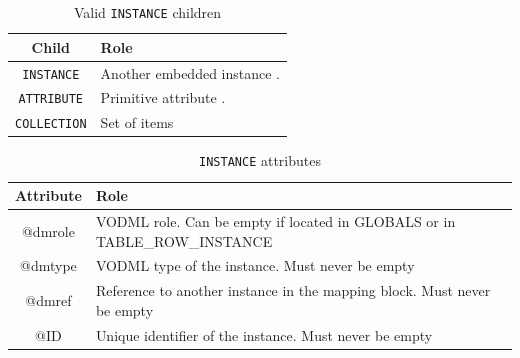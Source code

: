 \documentclass[11pt,a4paper]{ivoa}
\begin{document}
\begin{table}[!htbp]
\small
\centering
\begin{tabulary}{\linewidth}{|c|J|}       
       \hline 
           \textbf{Child} &  
           \textbf{Role} \\
       \hline         \hline  
           \texttt{INSTANCE}    & 
           Another embedded instance . \\       
       \hline  
           \texttt{ATTRIBUTE}    & 
           Primitive attribute . \\       
       \hline  
            \texttt{COLLECTION}    & 
           Set of items\\      
       \hline 
     \end{tabulary}
     \caption{Valid  \texttt{INSTANCE} children} 
     \label{tbl:inst-chilrdren}
\end{table}

\begin{table}[!htbp]
\small
\centering
\begin{tabulary}{\linewidth}{|c|J|}       
       \hline 
            \textbf{Attribute} &  
            \textbf{Role}\\
       \hline  
            @dmrole    & 
            VODML role.  \newline Can be empty if located in GLOBALS or in TABLE\_ROW\_INSTANCE \\
       \hline  
            @dmtype & 
            VODML type of the instance.  \newline Must never be empty \\
       \hline  
            @dmref  & 
            Reference to another instance in the mapping block. 
            \newline  Must never be empty\\          
       \hline  
            @ID  & 
            Unique identifier of the instance. 
            \newline  Must never be empty\\
       \hline 
     \end{tabulary}
     \caption{\texttt{INSTANCE} attributes} 
     \label{tbl:inst-att}
 \end{table}
\end{document}
